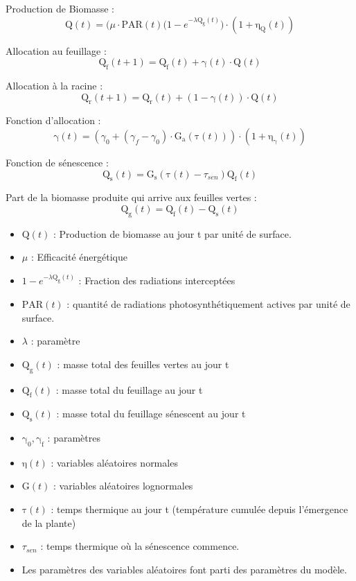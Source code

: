 Production de Biomasse :
\[ \mathrm{Q}(t) = \big(\mu\cdot\mathrm{PAR}(t)(1-e^{-\lambda\mathrm{Q_g}(t)}\big)\cdot(1+\mathrm{\eta_Q}(t)) \]

Allocation au feuillage :
\[ \mathrm{Q_f}(t+1) = \mathrm{Q_f}(t) + \mathrm{\gamma}(t)\cdot\mathrm{Q}(t) \]

Allocation à la racine :
\[ \mathrm{Q_r}(t+1) = \mathrm{Q_r}(t) + (1 -\mathrm{\gamma}(t))\cdot\mathrm{Q}(t) \]

Fonction d'allocation :
\[ \mathrm{\gamma}(t) = (\gamma_0 + (\gamma_f - \gamma_0)\cdot\mathrm{G_a}(\mathrm{\tau}(t)))\cdot(1+\mathrm{\eta_{\gamma}}(t)) \]

Fonction de sénescence :
\[ \mathrm{Q_s}(t) = \mathrm{G_s}(\mathrm{\tau}(t)- \tau_{sen})\mathrm{Q_f}(t) \]

Part de la biomasse produite qui arrive aux feuilles vertes :
\[\mathrm{Q_g}(t) = \mathrm{Q_f}(t) - \mathrm{Q_s}(t) \]

\begin{itemize}

\item $\mathrm{Q}(t)$ : Production de biomasse au jour t par unité de surface.
\item $\mu$ : Efficacité énergétique
\item $1-e^{-\lambda\mathrm{Q_g}(t)}$ : Fraction des radiations interceptées
\item $\mathrm{PAR}(t)$ : quantité de radiations photosynthétiquement actives par unité de surface.
\item $\lambda$ : paramètre
\item $\mathrm{Q_g}(t)$ : masse total des feuilles vertes au jour t
\item $\mathrm{Q_f}(t)$ : masse total du feuillage au jour t
\item $\mathrm{Q_s}(t)$ : masse total du feuillage sénescent au jour t 
\item $\mathrm{\gamma_0}, \mathrm{\gamma_f}$ : paramètres
\item $\mathrm{\eta}(t)$ : variables aléatoires normales 
\item $\mathrm{G}(t)$ : variables aléatoires lognormales
\item $\mathrm{\tau}(t)$ : temps thermique au jour t (température cumulée depuis l'émergence de la plante)
\item $\tau_{sen}$ : temps thermique où la sénescence commence.
\item Les paramètres des variables aléatoires font parti des paramètres du modèle.

\end{itemize}

